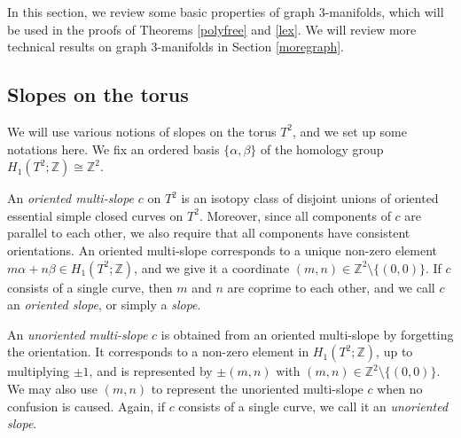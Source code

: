 \documentclass{amsart}
\numberwithin{equation}{section}
\theoremstyle{definition}
\begin{document}
In this section, we review some basic properties of graph $3$-manifolds, which will be used in the proofs of Theorems \ref{polyfree} and \ref{lex}. We will review more technical results on graph $3$-manifolds in Section \ref{moregraph}.

\subsection{Slopes on the torus}\label{slopes}
We will use various notions of slopes on the torus $T^2$, and we set up some notations here. We fix an ordered basis $\{\alpha,\beta\}$ of the homology group $H_1(T^2;\mathbb{Z})\cong \mathbb{Z}^2$.



An {\it oriented multi-slope} $c$ on $T^2$ is an isotopy class of disjoint unions of oriented essential simple closed curves on $T^2$. Moreover, since all components of $c$ are parallel to each other, we also require that all components have consistent orientations. An oriented multi-slope corresponds to a unique non-zero element $m\alpha+n\beta\in H_1(T^2;\mathbb{Z})$, and we give it a coordinate $(m,n)\in \mathbb{Z}^2\setminus \{(0,0)\}$. If $c$ consists of a single curve, then $m$ and $n$ are coprime to each other, and we call $c$ an {\it oriented slope}, or simply a {\it slope}.

An {\it unoriented multi-slope} $c$ is obtained from an oriented multi-slope by forgetting the orientation. It corresponds to a non-zero element in $H_1(T^2;\mathbb{Z})$, up to multiplying $\pm1$, and is represented by $\pm(m,n)$ with $(m,n)\in \mathbb{Z}^2\setminus \{(0,0)\}$. We may also use $(m,n)$ to represent the unoriented multi-slope $c$ when no confusion is caused. Again, if $c$ consists of a single curve, we call it an {\it unoriented slope}.
\end{document}
